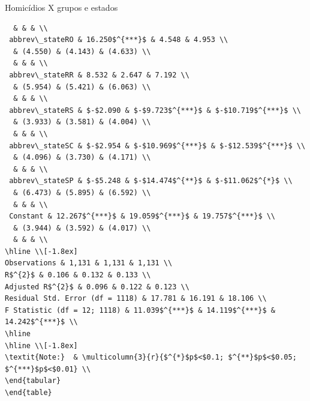 \documentclass[
  ignorenonframetext,
]{beamer}
\begin{document}
\begin{frame}[fragile]{Homicídios X grupos e estados}
\begin{verbatim}
  & & & \\ 
 abbrev\_stateRO & 16.250$^{***}$ & 4.548 & 4.953 \\ 
  & (4.550) & (4.143) & (4.633) \\ 
  & & & \\ 
 abbrev\_stateRR & 8.532 & 2.647 & 7.192 \\ 
  & (5.954) & (5.421) & (6.063) \\ 
  & & & \\ 
 abbrev\_stateRS & $-$2.090 & $-$9.723$^{***}$ & $-$10.719$^{***}$ \\ 
  & (3.933) & (3.581) & (4.004) \\ 
  & & & \\ 
 abbrev\_stateSC & $-$2.954 & $-$10.969$^{***}$ & $-$12.539$^{***}$ \\ 
  & (4.096) & (3.730) & (4.171) \\ 
  & & & \\ 
 abbrev\_stateSP & $-$5.248 & $-$14.474$^{**}$ & $-$11.062$^{*}$ \\ 
  & (6.473) & (5.895) & (6.592) \\ 
  & & & \\ 
 Constant & 12.267$^{***}$ & 19.059$^{***}$ & 19.757$^{***}$ \\ 
  & (3.944) & (3.592) & (4.017) \\ 
  & & & \\ 
\hline \\[-1.8ex] 
Observations & 1,131 & 1,131 & 1,131 \\ 
R$^{2}$ & 0.106 & 0.132 & 0.133 \\ 
Adjusted R$^{2}$ & 0.096 & 0.122 & 0.123 \\ 
Residual Std. Error (df = 1118) & 17.781 & 16.191 & 18.106 \\ 
F Statistic (df = 12; 1118) & 11.039$^{***}$ & 14.119$^{***}$ & 14.242$^{***}$ \\ 
\hline 
\hline \\[-1.8ex] 
\textit{Note:}  & \multicolumn{3}{r}{$^{*}$p$<$0.1; $^{**}$p$<$0.05; $^{***}$p$<$0.01} \\ 
\end{tabular} 
\end{table} 
\end{verbatim}
\end{frame}
\end{document}
